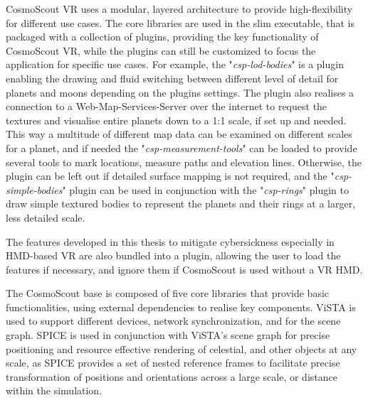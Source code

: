 CosmoScout VR uses a modular, layered architecture to provide high-flexibility for different use cases.
The core libraries are used in the slim executable, that is packaged with a collection of plugins, providing
the key functionality of CosmoScout VR, while the plugins can still be customized to focus the application for
specific use cases.
For example, the "\textit{csp-lod-bodies}" is a plugin enabling the drawing and fluid switching between different
level of detail for planets and moons depending on the plugins settings.
The plugin also realises a connection to a Web-Map-Services-Server over the internet to request the textures and
visualise entire planets down to a 1:1 scale, if set up and needed.
This way a multitude of different map data can be examined on different scales for a planet, and if needed the
"\textit{csp-measurement-tools}" can be loaded to provide several tools to mark locations, measure paths and
elevation lines.
Otherwise, the plugin can be left out if detailed surface mapping is not required, and the
"\textit{csp-simple-bodies}" plugin can be used in conjunction with the "\textit{csp-rings}" plugin to draw simple
textured bodies to represent the planets and their rings at a larger, less detailed scale.

The features developed in this thesis to mitigate cybersickness especially in HMD-based VR are also bundled into a
plugin, allowing the user to load the features if necessary, and ignore them if CosmoScout is used without a
VR HMD\@.

The CosmoScout base is composed of five core libraries that provide basic functionalities, using external
dependencies to realise key components.
ViSTA is used to support different devices, network synchronization, and for the scene graph.
SPICE is used in conjunction with ViSTA's scene graph for precise positioning and resource effective rendering of
celestial, and other objects at any scale, as SPICE provides a set of nested reference frames to facilitate precise
transformation of positions and orientations across a large scale, or distance within the simulation.
